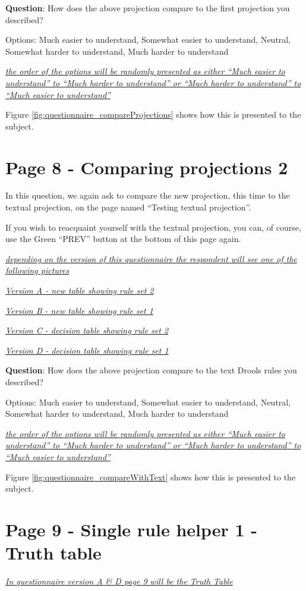 \textbf{Question}: How does the above projection compare to the first projection you described?

Options: Much easier to understand, Somewhat easier to understand, Neutral, Somewhat harder to understand, Much harder to understand

\emph{\underline{the order of the options will be randomly presented as either ``Much easier to understand'' to ``Much harder to understand'' or ``Much harder to understand'' to ``Much easier to understand'' }}

Figure \ref{fig:questionnaire_compareProjections} shows how this is presented to the subject.

\section{Page 8 - Comparing projections 2}

In this question, we again ask to compare the new projection, this time to the textual projection, on the page named ``Testing textual projection''.

If you wish to reacquaint yourself with the textual projection, you can, of course, use the Green ``PREV'' button at the bottom of this page again.

\emph{\underline{depending on the version of this questionnaire the respondent will see one of the following pictures}}

\emph{\underline{Version A - new table showing rule set 2}}

\emph{\underline{Version B - new table showing rule set 1}}

\emph{\underline{Version C - decision table showing rule set 2}}

\emph{\underline{Version D - decision table showing rule set 1}}

\textbf{Question}: How does the above projection compare to the text Drools rules you described?

Options: Much easier to understand, Somewhat easier to understand, Neutral, Somewhat harder to understand, Much harder to understand

\emph{\underline{the order of the options will be randomly presented as either ``Much easier to understand'' to ``Much harder to understand'' or ``Much harder to understand'' to ``Much easier to understand'' }}

Figure \ref{fig:questionnaire_compareWithText} shows how this is presented to the subject.

\section{Page 9 - Single rule helper 1 - Truth table}
\emph{\underline{In questionnaire version A \& D page 9 will be the Truth Table}}

